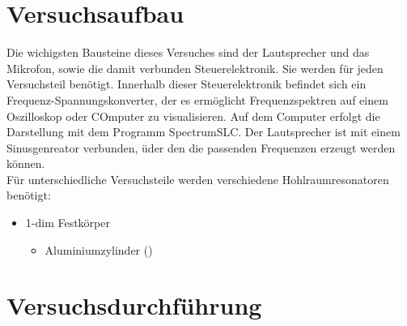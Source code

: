 \section{Versuchsaufbau}
\label{sec:Versuchsaufbau}
Die wichigsten Bausteine dieses Versuches sind der Lautsprecher und das Mikrofon, sowie 
die damit verbunden Steuerelektronik. Sie werden für jeden Versuchsteil benötigt.
Innerhalb dieser Steuerelektronik befindet sich ein Frequenz-Spannungskonverter, 
der es ermöglicht Frequenzspektren auf einem Oszilloskop oder COmputer zu visualisieren.
Auf dem Computer erfolgt die Darstellung mit dem Programm SpectrumSLC.
Der Lautsprecher ist mit einem Sinusgenreator verbunden, üder den die passenden 
Frequenzen erzeugt werden können.\\

Für unterschiedliche Versuchsteile werden verschiedene Hohlraumresonatoren benötigt:
\begin{itemize}
    \item 1-dim Festkörper
        \begin{itemize}
            \item Aluminiumzylinder ()
        \end{itemize}
\end{itemize}




\section{Versuchsdurchführung}
\label{sec:Versuchsdurchführung}
